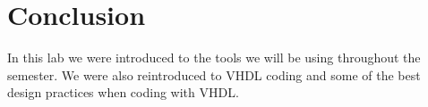 \documentclass{article}
\begin{document}
 




\section{Conclusion}
In this lab we were introduced to the tools we will be using throughout the semester. We were also reintroduced to VHDL coding and some of the best design practices when coding with VHDL.



%

%

\end{document}
